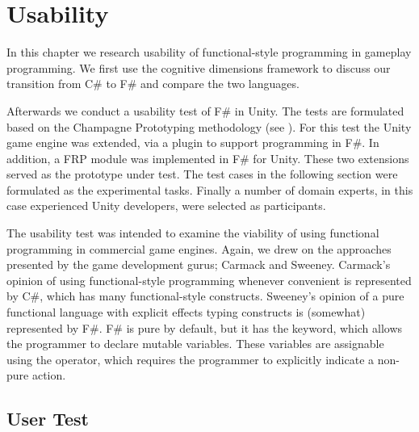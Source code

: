 \chapter{Usability}
In this chapter we research usability of functional-style programming in gameplay programming. We first use the cognitive dimensions framework to discuss our transition from C\# to F\# and compare the two languages.

Afterwards we conduct a usability test of F\# in Unity. The tests are formulated based on the Champagne Prototyping methodology (see ). For this test the Unity game engine was extended, via a plugin to support programming in F\#\cite{fsharp2019plugin}. In addition, a \gls{FRP} module was implemented in F\# for Unity. These two extensions served as the prototype under test. The test cases in the following section were formulated as the experimental tasks. Finally a number of domain experts, in this case experienced Unity developers, were selected as participants.

The usability test was intended to examine the viability of using functional programming in commercial game engines. Again, we drew on the approaches presented by the game development gurus; Carmack and Sweeney. Carmack's opinion of using functional-style programming whenever convenient is represented by C\#, which has many functional-style constructs. Sweeney's opinion of a pure functional language with explicit effects typing constructs is (somewhat) represented by F\#. F\# is pure by default, but it has the  keyword, which allows the programmer to declare mutable variables. These variables are assignable using the \ttt{\textless-} operator, which requires the programmer to explicitly indicate a non-pure action.


\section{User Test}
\metasheep




